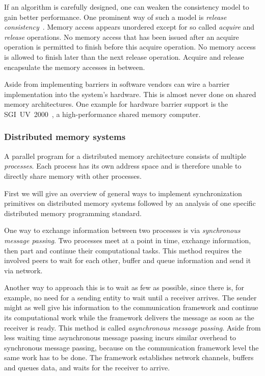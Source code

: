 \documentclass[a4paper, 10pt]{article}
\begin{document}
If an algorithm is carefully designed, one can weaken the consistency model to gain better performance. One prominent way of such a model is \textit{release consistency}~\cite{gha90}. Memory access appears unordered except for so called \emph{acquire} and \emph{release} operations. No memory access that has been issued after an acquire operation is permitted to finish before this acquire operation. No memory access is allowed to finish later than the next release operation. Acquire and release encapsulate the memory accesses in between.

Aside from implementing barriers in software vendors can wire a barrier implementation into the system's hardware. This is almost never done on shared memory architectures. One example for hardware barrier support is the SGI~UV~2000~\cite{sgiuv2000}, a high-performance shared memory computer.

\subsubsection{Distributed memory systems}
\label{sssec:background-means-distributed}
A parallel program for a distributed memory architecture consists of multiple \emph{processes}. Each process has its own address space and is therefore unable to directly share memory with other processes.

First we will give an overview of general ways to implement synchronization primitives on distributed memory systems followed by an analysis of one specific distributed memory programming standard.

One way to exchange information between two processes is via \emph{synchronous message passing}. Two processes meet at a point in time, exchange information, then part and continue their computational tasks. This method requires the involved peers to wait for each other, buffer and queue information and send it via network.

Another way to approach this is to wait as few as possible, since there is, for example, no need for a sending entity to wait until a receiver arrives. The sender might as well give his information to the communication framework and continue its computational work while the framework delivers the message as soon as the receiver is ready. This method is called \emph{asynchronous message passing}. Aside from less waiting time asynchronous message passing incurs similar overhead to synchronous message passing, because on the communication framework level the same work has to be done. The framework establishes network channels, buffers and queues data, and waits for the receiver to arrive.
\end{document}

